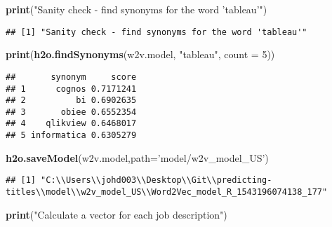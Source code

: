 \documentclass[]{article}
\newenvironment{Shaded}{\begin{snugshade}}{\end{snugshade}}
\newcommand{\KeywordTok}[1]{\textcolor[rgb]{0.13,0.29,0.53}{\textbf{{#1}}}}
\newcommand{\DataTypeTok}[1]{\textcolor[rgb]{0.13,0.29,0.53}{{#1}}}
\newcommand{\DecValTok}[1]{\textcolor[rgb]{0.00,0.00,0.81}{{#1}}}
\newcommand{\StringTok}[1]{\textcolor[rgb]{0.31,0.60,0.02}{{#1}}}
\newcommand{\NormalTok}[1]{{#1}}
\begin{document}
\begin{Shaded}
\begin{Highlighting}[]
\KeywordTok{print}\NormalTok{(}\StringTok{"Sanity check - find synonyms for the word 'tableau'"}\NormalTok{)}
\end{Highlighting}
\end{Shaded}

\begin{verbatim}
## [1] "Sanity check - find synonyms for the word 'tableau'"
\end{verbatim}

\begin{Shaded}
\begin{Highlighting}[]
\KeywordTok{print}\NormalTok{(}\KeywordTok{h2o.findSynonyms}\NormalTok{(w2v.model, }\StringTok{"tableau"}\NormalTok{, }\DataTypeTok{count =} \DecValTok{5}\NormalTok{))}
\end{Highlighting}
\end{Shaded}

\begin{verbatim}
##       synonym     score
## 1      cognos 0.7171241
## 2          bi 0.6902635
## 3       obiee 0.6552354
## 4    qlikview 0.6468017
## 5 informatica 0.6305279
\end{verbatim}

\begin{Shaded}
\begin{Highlighting}[]
\KeywordTok{h2o.saveModel}\NormalTok{(w2v.model,}\DataTypeTok{path=}\StringTok{'model/w2v_model_US'}\NormalTok{)}
\end{Highlighting}
\end{Shaded}

\begin{verbatim}
## [1] "C:\\Users\\johd003\\Desktop\\Git\\predicting-titles\\model\\w2v_model_US\\Word2Vec_model_R_1543196074138_177"
\end{verbatim}

\begin{Shaded}
\begin{Highlighting}[]
\KeywordTok{print}\NormalTok{(}\StringTok{"Calculate a vector for each job description"}\NormalTok{)}
\end{Highlighting}
\end{Shaded}
\end{document}
